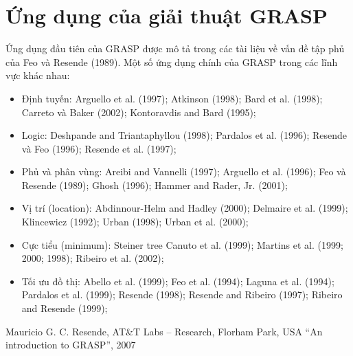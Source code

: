 \documentclass[14pt,a4paper]{report}
\begin{document}
\section{Ứng dụng của giải thuật GRASP}
Ứng dụng đầu tiên của GRASP được mô tả trong các tài liệu về vấn đề tập phủ của Feo và Resende (1989). Một số ứng dụng chính của GRASP trong các lĩnh vực khác nhau:
\begin{itemize}[noitemsep]
	\item Định tuyến: Arguello et al. (1997); Atkinson (1998); Bard et al. (1998); Carreto và Baker (2002); Kontoravdis and Bard (1995);
	\item Logic: Deshpande and Triantaphyllou (1998); Pardalos et al. (1996); Resende và Feo (1996); Resende et al. (1997);
	\item Phủ và phân vùng: Areibi and Vannelli (1997); Arguello et al. (1996); Feo và Resende (1989); Ghosh (1996); Hammer and Rader, Jr. (2001);
	\item Vị trí (location): Abdinnour-Helm and Hadley (2000); Delmaire et al. (1999); Klincewicz (1992); Urban (1998); Urban et al. (2000);
	\item Cực tiểu (minimum): Steiner tree Canuto et al. (1999); Martins et al. (1999; 2000; 1998); Ribeiro et al. (2002);
	\item Tối ưu đồ thị: Abello et al. (1999); Feo et al. (1994); Laguna et al.
	(1994); Pardalos et al. (1999); Resende (1998); Resende and Ribeiro (1997);
	Ribeiro and Resende (1999);
\end{itemize}


\begin{thebibliography}{99}
   Mauricio G. C. Resende, AT\&T Labs – Research, Florham Park, USA “An introduction to GRASP”, 2007
\end{thebibliography}
\newpage

\printindex
\end{document}
